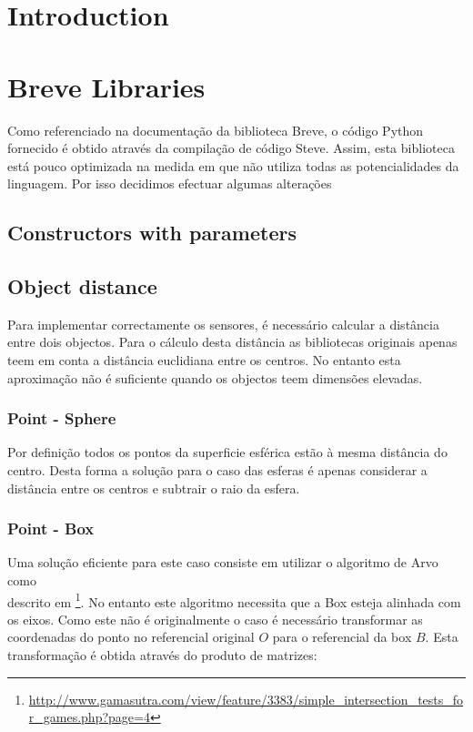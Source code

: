 \documentclass[a4paper]{article}
\title{\documentTitle}
\author{\documentAuthors{}}
\begin{document}
\maketitle
\cleardoublepage

\tableofcontents
\cleardoublepage

\setlength{\parindent}{1cm}
\setlength{\parskip}{0.3cm}

\section{Introduction}

\cleardoublepage
\section{Breve Libraries}
Como referenciado na documentação da biblioteca Breve, o código Python fornecido é obtido através da compilação de código Steve.
Assim, esta biblioteca está pouco optimizada na medida em que não utiliza todas as potencialidades da linguagem. 
Por isso decidimos efectuar algumas alterações

\subsection{Constructors with parameters}

\subsection{Object distance}
Para implementar correctamente os sensores, é necessário calcular a distância entre dois objectos.
Para o cálculo desta distância as bibliotecas originais apenas teem em conta a distância euclidiana entre os centros.
No entanto esta aproximação não é suficiente quando os objectos teem dimensões elevadas.

\subsubsection{Point - Sphere}
\indent \indent Por definição todos os pontos da superficie esférica estão à mesma distância do centro.
Desta forma a solução para o caso das esferas é apenas considerar a distância entre os centros e subtrair o raio da esfera.

\subsubsection{Point - Box}
\indent \indent Uma solução eficiente para este caso consiste em utilizar o algoritmo de Arvo como \\ descrito em  \footnote[1]{\url{http://www.gamasutra.com/view/feature/3383/simple_intersection_tests_for_games.php?page=4}}.
No entanto este algoritmo necessita que a Box esteja alinhada com os eixos.
Como este não é originalmente o caso é necessário transformar as coordenadas do ponto no referencial original $O$ para o referencial da box $B$.
Esta transformação é obtida através do produto de matrizes:
\end{document}
